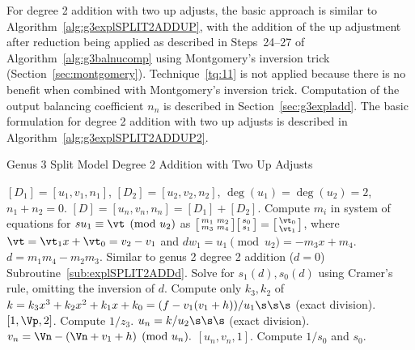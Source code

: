For degree 2 addition with two up adjusts, the basic approach is similar to
Algorithm~\ref{alg:g3explSPLIT2ADDUP}, with the addition of the up adjustment
after reduction being applied as described in Steps~24--27 of
Algorithm~\ref{alg:g3balnucomp} using Montgomery's inversion trick
(Section~\ref{sec:montgomery}). Technique~\ref{tq:11} is not applied because
there is no benefit when combined with Montgomery's inversion trick.
Computation of the output balancing coefficient $n_n$ is described in
Section~\ref{sec:g3expladd}. The basic formulation for degree 2 addition with
two up adjusts is described in Algorithm~\ref{alg:g3explSPLIT2ADDUP2}.


\begin{algorithm}[H]
\caption{Genus 3 Split Model Degree 2 Addition with Two Up Adjusts\label{alg:g3explSPLIT2ADDUP2}}
\begin{algorithmic} [1]
\Require $[D_1] = [u_1,v_1,n_1]$, $[D_2] = [u_2,v_2,n_2]$, $\deg(u_1) = \deg(u_2) = 2$, $n_1 + n_2 = 0$.
\Ensure $[D] = [u_n,v_n,n_n] = [D_1] + [D_2] $.
\algrule
\vspace{-2pt}
\State Compute $m_i$ in system of equations for $su_1\equiv \vt \pmod{u_2}$ as $ \bigl[ \begin{smallmatrix} m_1 & m_2\\ m_3 & m_4\end{smallmatrix}\bigr] \bigl[ \begin{smallmatrix} s_0\\ s_1 \end{smallmatrix} \bigr ] = \bigl[ \begin{smallmatrix}\vt_0 \\  \vt_1\end{smallmatrix} \bigr ]$, where $\vt = \vt_1x + \vt_0 = v_2 - v_1$ and $dw_1 = u_1 \pmod{u_2} = -m_3x + m_4$.
\State $d = m_1m_4 - m_2m_3$.
    \State Similar to genus 2 degree 2 addition ($d=0$) Subroutine~\ref{sub:explSPLIT2ADDd}.
\EndIf
\State Solve for $s_1(d), s_0(d)$ using Cramer's rule, omitting the inversion of $d$.
\State Compute only $k_3, k_2$ of $k = k_3x^3 + k_2x^2 + k_1x + k_0 = (f - v_1(v_1 + h))/u_1 \s\s\s$ (exact division).  
         \Return $[1,\Vp,2]$.
        \Else \hspace{3pt} Compute $1/z_3$.
            \State $u_n = k/u_2 \s\s\s$ (exact division).
            \State $v_n = \Vn - (\Vn + v_1 + h) \pmod{u_n}.$
            \State \Return $[u_n,v_n,1]$.
        \EndIf
    \Else \hspace{3pt} Compute $1/s_0$ and $s_0$.

\end{algorithmic}
\end{algorithm}
